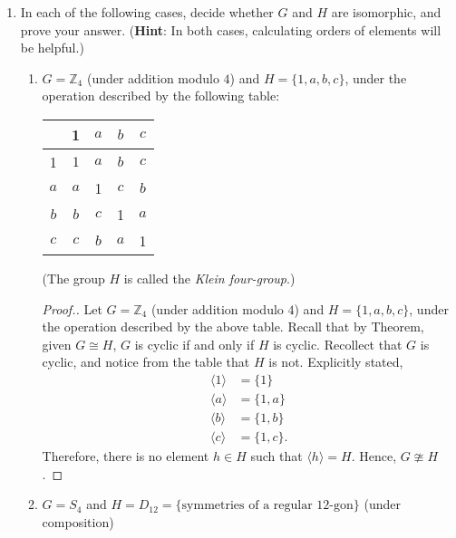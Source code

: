 \documentclass[11pt,twoside]{article}
\begin{document}
\begin{enumerate}
\vspace{0.5cm}

\item In each of the following cases, decide whether $G$ and $H$ are isomorphic, and prove your answer.  ({\bf Hint}: In both cases, calculating orders of elements will be helpful.)

\begin{enumerate}

\item $G = \mathbb{Z}_4$ (under addition modulo $4$) and $H = \{1,a,b,c\}$, under the operation described by the following table:

\begin{center}
\begin{tabular}{|c||c|c|c|c|}
\hline
 & 1 & $a$ & $b$ & $c$\\
 \hline
 \hline
  1 & $1$ & $a$ & $b$ & $c$ \\
 \hline
 $a$ & $a$ & 1 & $c$ & $b$ \\
 \hline
  $b$ & $b$ & $c$ & 1 & $a$ \\
 \hline
  $c$ & $c$ & $b$ & $a$ & 1 \\
 \hline
 \end{tabular}
 \end{center}
 
(The group $H$ is called the {\it Klein four-group}.)
 
\begin{proof}[\color{red}Proof.]Let $G = \mathbb{Z}_4$ (under addition modulo $4$) and $H = \{1,a,b,c\}$, under the operation described by the above table.  Recall that by Theorem, given $G \cong H$, $G$ is cyclic if and only if $H$ is cyclic.  Recollect that $G$ is cyclic, and notice from the table that $H$ is not. Explicitly stated,
\begin{align*}
\langle 1 \rangle &= \{ 1 \}\\
\langle a \rangle &= \{ 1, a \}\\
\langle b \rangle &= \{ 1, b \}\\
\langle c \rangle &= \{ 1, c \}.
\end{align*}
Therefore, there is no element $h \in H$ such that $\langle h \rangle = H$.  Hence, $G \ncong H$.
\end{proof}
 
\vspace{0.25cm}
 
\item $G = S_4$ and $H = D_{12} = \{\text{symmetries of a regular } 12\text{-gon}\}$ (under composition)
 

\end{enumerate}
\end{enumerate}
\end{document}
